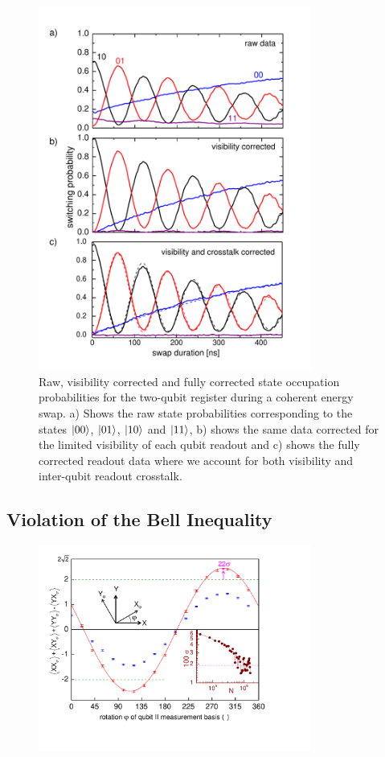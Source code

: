 \begin{figure}[p!]
	\centering
	\includegraphics[width=0.8\textwidth]{"./material/papers/iswap/figures/swap_raw_and_corrected"}
	\caption[]{Raw, visibility corrected and fully corrected state occupation probabilities for the two-qubit register during a coherent energy swap. a) Shows the raw state probabilities corresponding to the states $\left| 00 \right>$, $\left| 01 \right>$, $\left| 10 \right>$ and $\left| 11 \right>$, b) shows the same data corrected for the limited visibility of each qubit readout and c) shows the fully corrected readout data where we account for both visibility and inter-qubit readout crosstalk.}
	\label{fig:swap_raw_and_corrected}
\end{figure}

\subsection{Violation of the Bell Inequality}

\begin{figure}
	\centering
		\includegraphics[width=0.8\textwidth]{./material/papers/iswap/figures/chsh}
	\caption{}
	\label{fig:CHSH}
\end{figure}

